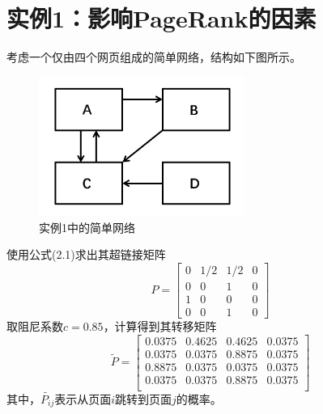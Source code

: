 \documentclass[UTF8,openany]{ctexbook}
\begin{document}
\section[实例1：影响PageRank的因素]{实例1：影响PageRank的因素}
考虑一个仅由四个网页组成的简单网络，结构如下图所示。
\begin{figure}[H]
    \begin{center}
        \includegraphics[width=0.6\textwidth]{images/pic1.png}
        \caption{实例1中的简单网络}
    \end{center}
\end{figure}
使用公式(2.1)求出其超链接矩阵
$$
    P=\begin{bmatrix}
        0 & 1/2 & 1/2 & 0 \\
        0 & 0   & 1   & 0 \\
        1 & 0   & 0   & 0 \\
        0 & 0   & 1   & 0
    \end{bmatrix}
$$
取阻尼系数$c=0.85$，计算得到其转移矩阵\
$$
    \widetilde{P}=\begin{bmatrix}
        0.0375 & 0.4625 & 0.4625 & 0.0375 \\
        0.0375 & 0.0375 & 0.8875 & 0.0375 \\
        0.8875 & 0.0375 & 0.0375 & 0.0375 \\
        0.0375 & 0.0375 & 0.8875 & 0.0375 \\
    \end{bmatrix}
$$
其中，$\widetilde{P_{ij}}$表示从页面$i$跳转到页面$j$的概率。
\end{document}
